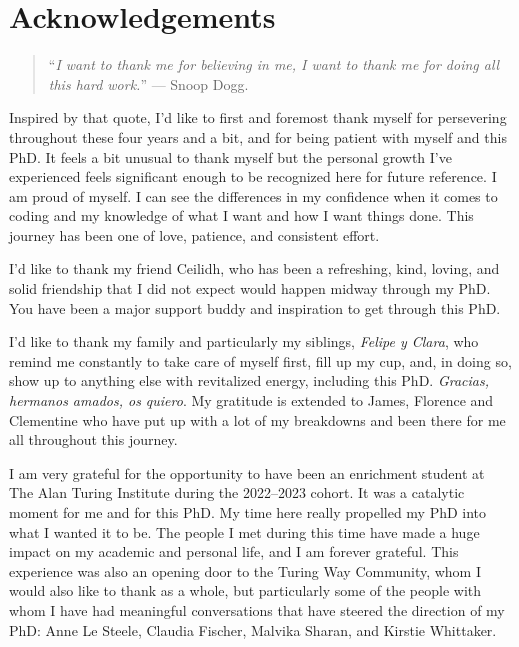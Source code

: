 \documentclass[
  11pt,
  letterpaper,
]{scrreprt}
\begin{document}

\chapter*{Acknowledgements}\label{acknowledgements}


\begin{quote}
``\emph{I want to thank me for believing in me, I want to thank me for
doing all this hard work.}'' --- Snoop Dogg.
\end{quote}

Inspired by that quote, I'd like to first and foremost thank myself for
persevering throughout these four years and a bit, and for being patient
with myself and this PhD. It feels a bit unusual to thank myself but the
personal growth I've experienced feels significant enough to be
recognized here for future reference. I am proud of myself. I can see
the differences in my confidence when it comes to coding and my
knowledge of what I want and how I want things done. This journey has
been one of love, patience, and consistent effort.

I'd like to thank my friend Ceilidh, who has been a refreshing, kind,
loving, and solid friendship that I did not expect would happen midway
through my PhD. You have been a major support buddy and inspiration to
get through this PhD.

I'd like to thank my family and particularly my siblings, \emph{Felipe y
Clara}, who remind me constantly to take care of myself first, fill up
my cup, and, in doing so, show up to anything else with revitalized
energy, including this PhD. \emph{Gracias, hermanos amados, os quiero}.
My gratitude is extended to James, Florence and Clementine who have put
up with a lot of my breakdowns and been there for me all throughout this
journey.

I am very grateful for the opportunity to have been an enrichment
student at The Alan Turing Institute during the 2022--2023 cohort. It
was a catalytic moment for me and for this PhD. My time here really
propelled my PhD into what I wanted it to be. The people I met during
this time have made a huge impact on my academic and personal life, and
I am forever grateful. This experience was also an opening door to the
Turing Way Community, whom I would also like to thank as a whole, but
particularly some of the people with whom I have had meaningful
conversations that have steered the direction of my PhD: Anne Le Steele,
Claudia Fischer, Malvika Sharan, and Kirstie Whittaker.
\end{document}

